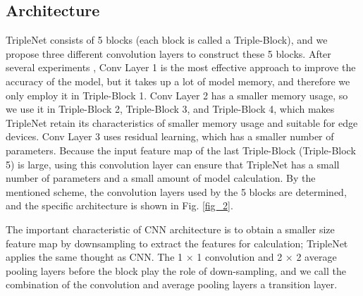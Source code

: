 \documentclass[default,iicol]{sn-jnl}
\theoremstyle{thmstyleone}\newtheorem{theorem}{Theorem}\newtheorem{proposition}[theorem]{Proposition}
\theoremstyle{thmstyletwo}\newtheorem{example}{Example}\newtheorem{remark}{Remark}
\theoremstyle{thmstylethree}\newtheorem{definition}{Definition}
\begin{document}
\subsection{Architecture}
TripleNet consists of 5 blocks (each block is called a Triple-Block), and we propose three different convolution layers to construct these 5 blocks. After several experiments \cite{huang2017densely,ju2022threshnet,hu2017log}, Conv Layer 1 is the most effective approach to improve the accuracy of the model, but it takes up a lot of model memory, and therefore we only employ it in Triple-Block 1. Conv Layer 2 has a smaller memory usage, so we use it in Triple-Block 2, Triple-Block 3, and Triple-Block 4, which makes TripleNet retain its characteristics of smaller memory usage and suitable for edge devices. Conv Layer 3 uses residual learning, which has a smaller number of parameters. Because the input feature map of the last Triple-Block (Triple-Block 5) is large, using this convolution layer can ensure that TripleNet has a small number of parameters and a small amount of model calculation. By the mentioned scheme, the convolution layers used by the 5 blocks are determined, and the specific architecture is shown in Fig. \ref{fig_2}.

The important characteristic of CNN architecture is to obtain a smaller size feature map by downsampling to extract the features for calculation; TripleNet applies the same thought as CNN. The 1 × 1 convolution and 2 × 2 average pooling layers before the block play the role of down-sampling, and we call the combination of the convolution and average pooling layers a transition layer.
\end{document}
